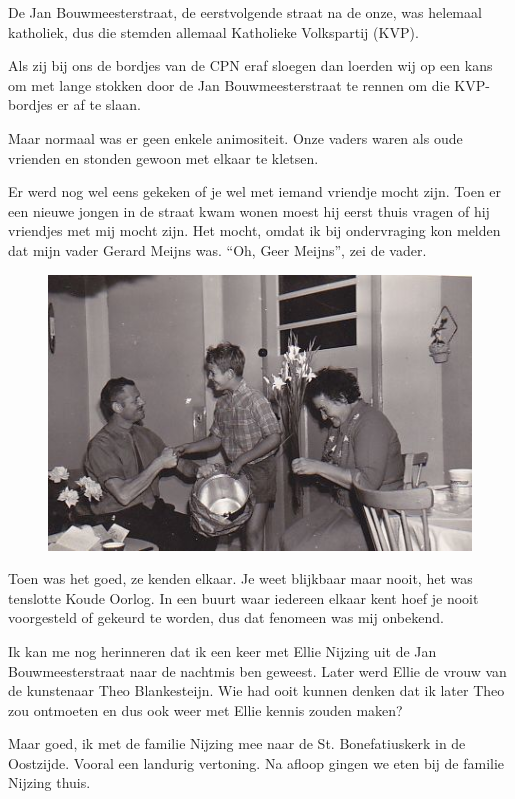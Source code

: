 \documentclass[12pt,twoside]{memoir}
\begin{document}
De Jan Bouwmeesterstraat, de eerstvolgende straat na de onze, was helemaal katholiek, dus die stemden allemaal Katholieke Volkspartij (KVP). 

Als zij bij ons de bordjes van de CPN eraf sloegen dan loerden wij op een kans om met lange stokken door de Jan Bouwmeesterstraat te rennen om die KVP-bordjes er af te slaan.

Maar normaal was er geen enkele animositeit. Onze vaders waren als oude vrienden en stonden gewoon met elkaar te kletsen. 

Er werd nog wel eens gekeken of je wel met iemand vriendje mocht zijn. Toen er een nieuwe jongen in de straat kwam wonen moest hij eerst thuis vragen of hij vriendjes met mij mocht zijn. Het mocht, omdat ik bij ondervraging kon melden dat mijn vader Gerard Meijns was. ``Oh, Geer Meijns'', zei de vader. 

\begin{figure}
\includegraphics[width=\textwidth]{img/ch5/vanharte}
\caption*{\footnotesize }
\end{figure} 

Toen was het goed, ze kenden elkaar. Je weet blijkbaar maar nooit, het was tenslotte Koude Oorlog. In een buurt waar iedereen elkaar kent hoef je nooit voorgesteld of gekeurd te worden, dus dat fenomeen was mij onbekend.

Ik kan me nog herinneren dat ik een keer met Ellie Nijzing uit de Jan Bouwmeesterstraat naar de nachtmis ben geweest. Later werd Ellie de vrouw van de kunstenaar Theo Blankesteijn. Wie had ooit kunnen denken dat ik later Theo zou ontmoeten en dus ook weer met Ellie kennis zouden maken?

Maar goed, ik met de familie Nijzing mee naar de St. Bonefatiuskerk in de Oostzijde. Vooral een landurig vertoning. Na afloop gingen we eten bij de familie Nijzing thuis. 
\end{document}
